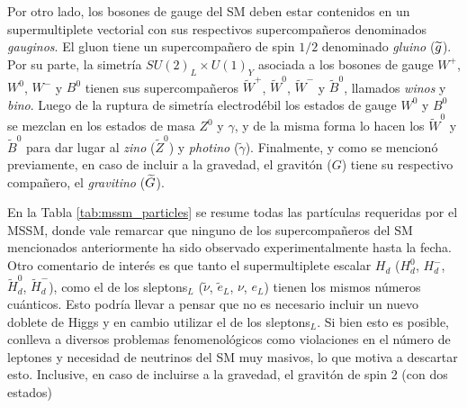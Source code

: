 Por otro lado, los bosones de gauge del SM deben estar contenidos en un supermultiplete vectorial con sus respectivos supercompañeros denominados \textit{gauginos}. El gluon tiene un supercompañero de spin $1/2$ denominado \textit{gluino} ($\widetilde{g}$). Por su parte, la simetría $SU(2)_L\times U(1)_Y$ asociada a los bosones de gauge $W^+$, $W^0$, $W^-$ y $B^0$ tienen sus supercompañeros $\widetilde{W}^+$, $\widetilde{W}^0$, $\widetilde{W}^-$ y $\tilde{B}^0$, llamados \textit{winos} y \textit{bino}. Luego de la ruptura de simetría electrodébil los estados de gauge $W^0$ y $B^0$ se mezclan en los estados de masa $Z^0$ y $\gamma$, y de la misma forma lo hacen los $\widetilde{W}^0$ y $\widetilde{B}^0$ para dar lugar al \textit{zino} ($\widetilde{Z}^0$) y \textit{photino} ($\tilde{\gamma}$). Finalmente, y como se mencionó previamente, en caso de incluir a la gravedad, el gravitón ($G$) tiene su respectivo compañero, el \textit{gravitino} ($\widetilde{G}$).

En la Tabla \ref{tab:mssm_particles} se resume todas las partículas requeridas por el MSSM, donde vale remarcar que ninguno de los supercompañeros del SM mencionados anteriormente ha sido observado experimentalmente hasta la fecha. Otro comentario de interés es que tanto el supermultiplete escalar $H_d$ ($H_d^0$, $H_d^-$, $\widetilde{H}_d^0$, $\widetilde{H}_d^-$), como el de los sleptons$_L$ ($\tilde{\nu}$, $\tilde{e}_L$, $\nu$, $e_L$) tienen los mismos números cuánticos. Esto podría llevar a pensar que no es necesario incluir un nuevo doblete de Higgs y en cambio utilizar el de los sleptons$_L$. Si bien esto es posible, conlleva a diversos problemas fenomenológicos como violaciones en el número de leptones y necesidad de neutrinos del SM muy masivos, lo que motiva a descartar esto. Inclusive, en caso de incluirse a la gravedad, el gravitón de spin 2 (con dos estados)


